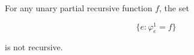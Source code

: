 For any unary partial recursive function $f$, the set

$$\{e : \varphi^1_e = f\}$$

is not recursive.
